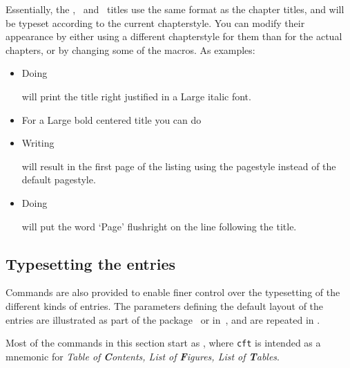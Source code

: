     Essentially, the \toc, \lof\ and \lot\ titles use the same format
as the chapter titles, and will be typeset according to the current
chapterstyle. You can modify their appearance by either using a
different chapterstyle for them than for the actual chapters, or
by changing some of the macros. As examples:
\begin{itemize}
\item Doing
      \begin{lcode}
      \renewcommand{\printXtitle}[1]{\hfill\Large\itshape #1}
      \end{lcode}
      will print the title right justified in a Large italic font.
\item For a Large bold centered title you can do
      \begin{lcode}
      \renewcommand{\printXtitle}[1]{\centering\Large\bfseries #1}
      \end{lcode}
\item Writing
      \begin{lcode}
      \renewcommand{\afterXtitle}{%
                        \thispagestyle{empty}\afterchaptertitle}
      \end{lcode}
      will result in the first page of the listing using the 
      pagestyle instead of the default  pagestyle.
\item Doing
      \begin{lcode}
      \renewcommand{\afterXtitle}{%
        \par\nobreak \mbox{}\hfill{\normalfont Page}\par\nobreak}
      \end{lcode}
      will put the word `Page' flushright on the line following
      the title.
\end{itemize}


 \subsection{Typesetting the entries} \label{sec:entries}

 Commands are also provided to enable finer control over the typesetting
 of the different kinds of entries. The parameters defining the default
 layout of the entries are illustrated as part of the 
 package~\cite{LAYOUTS} or in~\cite[p. 51]{COMPANION}, and are repeated in
 .

    Most of the commands in this section start as , where
\texttt{cft} is intended as a mnemonic for \textit{Table of \textbf{C}ontents, 
List of \textbf{F}igures, List of \textbf{T}ables}.

